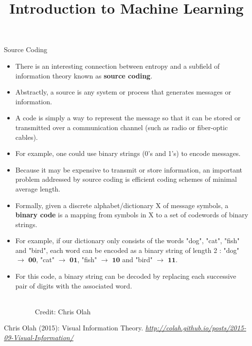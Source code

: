 \documentclass[11pt,compress,t,notes=noshow, xcolor=table]{beamer}
\title{Introduction to Machine Learning}
\date{}
\begin{document}


\begin{vbframe} {Source Coding}
\begin{itemize}
  \item There is an interesting connection between entropy and a subfield of information theory known as \textbf{source coding}.
  \item Abstractly, a source is any system or process that generates messages or information.
  \item A code is simply a way to represent the message so that it can be stored or transmitted over a communication channel (such as radio or fiber-optic cables).
  \item For example, one could use binary strings (0's and 1's) to encode messages.
  \item Because it may be expensive to transmit or store information, an important problem addressed by source coding is efficient coding schemes of minimal average length.
\end{itemize}

\framebreak

\begin{itemize}
  \item Formally, given a discrete alphabet/dictionary X of message symbols, a \textbf{binary code} is a mapping
from symbols in X to a set of codewords of binary strings.
 \item For example, if our dictionary only consists of the words "dog", "cat", "fish" and "bird", each word can be encoded as a binary string of length 2 : "dog" $\rightarrow$ $\mathbf{00}$, "cat" $\rightarrow$ $\mathbf{01}$, "fish" $\rightarrow$ $\mathbf{10}$ and "bird" $\rightarrow$ $\mathbf{11}$.
 \item For this code, a binary string can be decoded by replacing each successive pair of digits with the associated word.
\begin{figure}
    \centering
      \tiny{\\ Credit: Chris Olah\\}
  \end{figure}
\end{itemize}
 {\tiny{Chris Olah (2015): Visual Information Theory. \emph{\url{http://colah.github.io/posts/2015-09-Visual-Information/}}}\par}
\framebreak


\end{vbframe}
\end{document}
